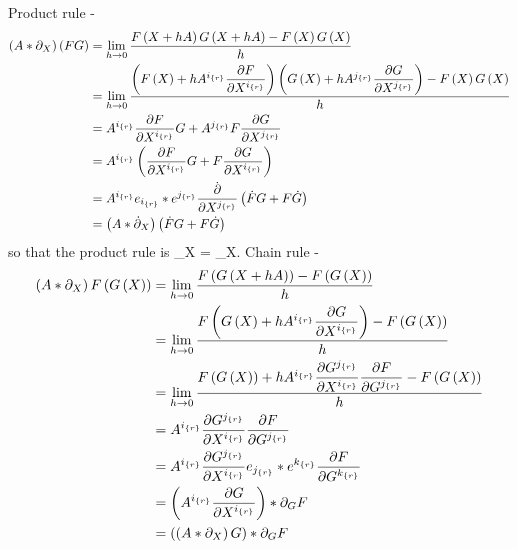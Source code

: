 Product rule -
\begin{align}
	\paren{A*\partial_{X}}\paren{FG} &= \lim_{h\rightarrow 0}\bfrac{\f{F}{X+hA}\f{G}{X+hA}-\f{F}{X}\f{G}{X}}{h} \nonumber \\
	                                 &= \lim_{h\rightarrow 0}\bfrac{\paren{\f{F}{X}+hA^{\ndx{i}{r}}\pdiff{F}{X^{\ndx{i}{r}}}}
	                                    \paren{\f{G}{X}+hA^{\ndx{j}{r}}\pdiff{G}{X^{\ndx{j}{r}}}}-\f{F}{X}\f{G}{X}}{h} \nonumber \\
	                                 &= A^{\ndx{i}{r}}\pdiff{F}{X^{\ndx{i}{r}}}G+A^{\ndx{j}{r}}F\pdiff{G}{X^{\ndx{j}{r}}} \nonumber \\
	                                 &= A^{\ndx{i}{r}}\paren{\pdiff{F}{X^{\ndx{i}{r}}}G+F\pdiff{G}{X^{\ndx{i}{r}}}} \nonumber \\
                                     &= A^{\ndx{i}{r}}\ed{i}{r}*\eu{j}{r}\dot{\pdiff{}{X^{\ndx{j}{r}}}}\paren{\dot{F}G+F\dot{G}} \nonumber \\
	                                 &= \paren{A*\dot{\partial}_{X}}\paren{\dot{F}G+F\dot{G}}
\end{align}
so that the product rule is
\be
	\partial_{X} = \dot{\partial}_{X}.
\ee
Chain rule -
\begin{align}
	\paren{A*\partial_{X}}\f{F}{\f{G}{X}} &= \lim_{h\rightarrow 0}\bfrac{\f{F}{\f{G}{X+hA}}-\f{F}{\f{G}{X}}}{h} \nonumber \\
	                                      &= \lim_{h\rightarrow 0}\bfrac{\f{F}{\f{G}{X}+hA^{\ndx{i}{r}}\pdiff{G}{X^{\ndx{i}{r}}}}-\f{F}{\f{G}{X}}}{h} \nonumber \\
	                                      &= \lim_{h\rightarrow 0}\bfrac{\f{F}{\f{G}{X}}
	                                         +hA^{\ndx{i}{r}}\pdiff{G^{\ndx{j}{r}}}{X^{\ndx{i}{r}}}\pdiff{F}{G^{\ndx{j}{r}}}-\f{F}{\f{G}{X}}}{h} \nonumber \\
	                                      &= A^{\ndx{i}{r}}\pdiff{G^{\ndx{j}{r}}}{X^{\ndx{i}{r}}}\pdiff{F}{G^{\ndx{j}{r}}} \nonumber \\
	                                      &= A^{\ndx{i}{r}}\pdiff{G^{\ndx{j}{r}}}{X^{\ndx{i}{r}}}\ed{j}{r}*\eu{k}{r}\pdiff{F}{G^{\ndx{k}{r}}} \nonumber \\
	                                      &= \paren{A^{\ndx{i}{r}}\pdiff{G}{X^{\ndx{i}{r}}}}*\partial_{G}F \nonumber \\
	                                      &= \paren{\paren{A*\partial_{X}}G}*\partial_{G}F \label{eq_chainrule}
\end{align}
